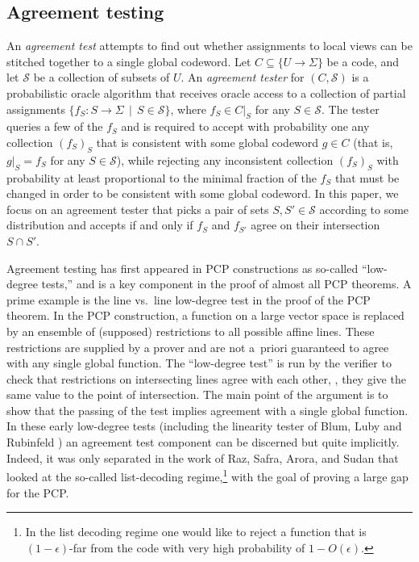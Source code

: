 \documentclass{toc}
\theoremstyle{plain}
\newcommand{\calS}{{\mathcal{S}}}
\begin{document}
\subsection{Agreement testing}

An \emph{agreement test} attempts to find out whether
%
%
assignments to local views 
can be stitched together to a single global codeword. Let $C \subseteq \{U \to \Sigma\}$  be a code, and let $\calS$ be a collection of subsets of $U$.
An \emph{agreement tester} for %
$(C, \calS)$   %
%
is a probabilistic oracle algorithm that receives oracle access to a collection of partial assignments $\{f_S:S\to \Sigma \,\mid\, S\in \calS\}$,
%
where $f_S \in C|_S$ for any $S \in \calS$. The tester queries a few of 
%
%
the $f_S$ %
%
and is required to accept with probability one any collection $(f_S)_S$ that is consistent with some global codeword $g \in C$ (that is, $g|_S = f_S$ for any $S \in \calS$), while rejecting any inconsistent collection $(f_S)_S$
with probability
at least  %
proportional to the minimal fraction
%
of the $f_S$  %
that  must be changed in order to be consistent with some global codeword. In this %
paper,   %
we focus on an agreement tester that picks a pair of sets $S,S' \in \calS$ according to some distribution and accepts if and only if $f_S$ and $f_{S'}$ agree on their intersection $S\cap S'$.

Agreement testing has first appeared in PCP constructions  \cite{BabaiFL1991,BabaiFLS1991,FeigeGLSS1996,AroraS1998,AroraLMSS1998}  as so-called ``low-degree tests,'' and is a key component in the proof of almost all PCP theorems.
A prime example is the line vs.\ line low-degree test  \cite{GemmellLRSW1991,RubinfeldS1996} in the proof of the PCP theorem. In the PCP construction, a function on a large vector space is replaced by an ensemble of (supposed) restrictions to all possible affine lines. These restrictions are supplied by a prover and are not a~priori guaranteed to agree with any single global function. The  ``low-degree test'' is run by the verifier to check that restrictions on intersecting lines agree with each other, \ie, they give the same value to the point of intersection. The main point of the argument is to show that the passing of the test implies agreement with a single global function.
In these early low-degree tests (including the linearity
%
tester  %
of Blum, Luby and Rubinfeld \cite{BlumLR1993}) an agreement test component can be discerned but quite implicitly. Indeed, it was only separated in the
%
work of Raz, Safra, Arora, and Sudan %
%
\cite{RazS1997,AroraS2003} that looked at the so-called list-decoding regime,\footnote{In the list decoding regime one would like to reject a function that is $(1-\epsilon)$-far from the code with very
%
high probability  %
of $1-O(\epsilon)$.} with the goal of proving a large gap for the PCP.
\end{document}
